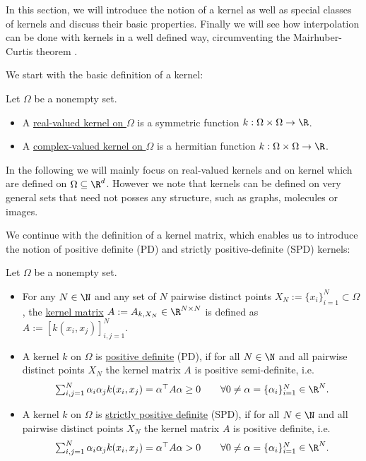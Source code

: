 In this section, we will introduce the notion of a kernel as well as special classes of kernels 
and discuss their basic properties.
Finally we will see how interpolation can be done with kernels in a well defined way, circumventing the Mairhuber-Curtis theorem .

We start with the basic definition of a kernel:

\begin{definition}
Let $\Omega$ be a nonempty set. 
\begin{itemize}
\item A \underline{real-valued kernel on $\Omega$} is a symmetric function $k: \Omega \times \Omega \rightarrow \R$.
\item A \underline{complex-valued kernel on $\Omega$} is a hermitian function $k: \Omega \times \Omega \rightarrow \R$.
\end{itemize}
\end{definition}

In the following we will mainly focus on real-valued kernels and on kernel which are defined on $\Omega \subseteq \R^d$.
However we note that kernels can be defined on very general sets that need not posses any structure, such as graphs, molecules or images.

We continue with the definition of a kernel matrix, 
which enables us to introduce the notion of positive definite (PD) and strictly positive-definite (SPD) kernels:

\begin{definition}
\label{def:positive_def_kernels}
Let $\Omega$ be a nonempty set.
\begin{itemize}
\item For any $N \in \N$ and any set of $N$ pairwise distinct points $X_N := \{ x_i \}_{i=1}^N \subset \Omega$, the \underline{kernel matrix} $A := A_{k, X_N} \in \R^{N \times N}$ is defined as $A := [k(x_i, x_j)]_{i,j=1}^N$.
\item A kernel $k$ on $\Omega$ is \underline{positive definite} (PD), if for all $N \in \N$ and all pairwise distinct points $X_N$ the kernel matrix $A$ is positive semi-definite, i.e.\
\begin{align*}
\textstyle \sum_{i,j=1}^N \alpha_i \alpha_j k(x_i, x_j) = \alpha^\top A \alpha \geq 0 \qquad \forall 0 \neq \alpha = \{ \alpha_i \}_{i=1}^N \in \R^N.
\end{align*}
\item A kernel $k$ on $\Omega$ is \underline{strictly positive definite} (SPD), if for all $N \in \N$ and all pairwise distinct points $X_N$ the kernel matrix $A$ is positive definite, i.e.\
\begin{align*}
\textstyle \sum_{i,j=1}^N \alpha_i \alpha_j k(x_i, x_j) = \alpha^\top A \alpha > 0 \qquad \forall 0 \neq \alpha = \{ \alpha_i \}_{i=1}^N \in \R^N.
\end{align*} 
\end{itemize}
\end{definition}

